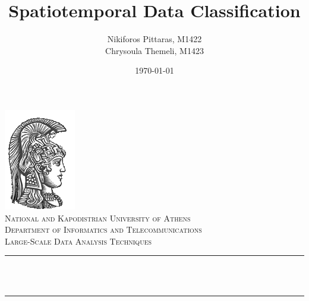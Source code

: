 \documentclass[12pt]{article}
\title{Spatiotemporal Data Classification}   %
\author{ Nikiforos Pittaras, M1422 \\ 
		 Chrysoula Themeli, M1423}                               %
\date{\today}  %
\makeatletter
\let\thetitle\@title
\let\theauthor\@author
\let\thedate\@date
\makeatother
\begin{document}
	
	
	\begin{titlepage}
		\centering
		\vspace*{0.5 cm}
		\includegraphics[scale = 0.75]{ekpalogo.png}\\[1.0 cm]   %
		\textsc{\LARGE National and Kapodistrian University of Athens}\\[2.0 cm]   %
		\textsc{\Large Department of Informatics and Telecommunications}\\[0.5 cm]               %
		\textsc{\large Large-Scale Data Analysis Techniques}\\[0.5 cm] %
		\rule{\linewidth}{0.2 mm} \\[0.4 cm]
		{ \huge \bfseries \thetitle}\\
		\rule{\linewidth}{0.2 mm} \\[1.5 cm]
		
		\begin{minipage}{0.4\textwidth}
			\begin{center} \large
				\theauthor
			\end{center}
		\end{minipage}~
		\begin{minipage}{0.4\textwidth}
		\end{minipage}\\[2 cm]
		
		{\large \thedate}\\[2 cm]
		
		\vfill
		
	\end{titlepage}
	
	
	\tableofcontents
    \newpage
	\listoffigures
	\newpage
	
\end{document}
